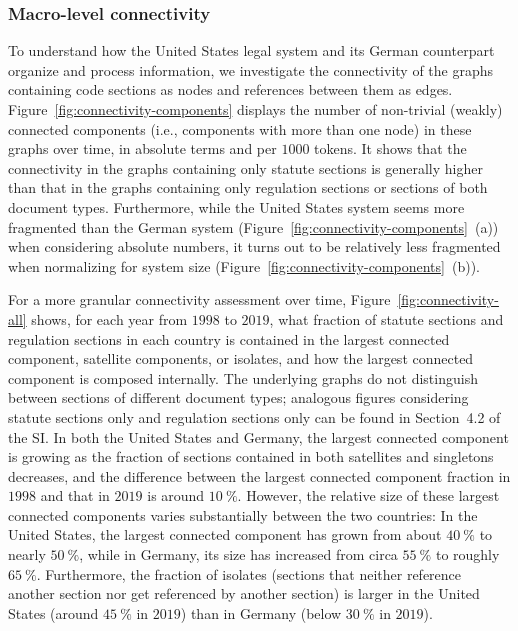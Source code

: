 \documentclass[utf8,sort&compress,table,hidelinks]{frontiersFPHY} %
\newcommand{\thesi}{SI\xspace}
\begin{document}
\vspace*{6pt}
\subsubsection{Macro-level connectivity}
\label{subsubsec:results:connectivity:macro}

To understand how the United States legal system and its German counterpart organize and process information, we investigate the connectivity of the graphs containing code sections as nodes and references between them as edges. 
Figure~\ref{fig:connectivity-components} displays the number of non-trivial (weakly) connected components (i.e., components with more than one node) in these graphs over time, 
in absolute terms and per $1000$ tokens.
It shows that the connectivity in the graphs containing only statute sections is generally higher than that in the graphs containing only regulation sections or sections of both document types.
Furthermore, while the United States system seems more fragmented than the German system (Figure~\ref{fig:connectivity-components}~(a)) when considering absolute numbers, it turns out to be relatively less fragmented when normalizing for system size (Figure~\ref{fig:connectivity-components}~(b)).



For a more granular connectivity assessment over time, Figure~\ref{fig:connectivity-all} shows, for each year from $1998$ to $2019$, what fraction of statute sections and regulation sections in each country is contained in the largest connected component, satellite components, or isolates, 
and how the largest connected component is composed internally. 
The underlying graphs do not distinguish between sections of different document types; 
analogous figures considering statute sections only and regulation sections only can be found in Section~4.2 of the \thesi.
In both the United States and Germany, the largest connected component is growing as the fraction of sections contained in both satellites and singletons decreases, 
and the difference between the largest connected component fraction in $1998$ and that in $2019$ is around $10~\%$. 
However, the relative size of these largest connected components varies substantially between the two countries: 
In the United States, the largest connected component has grown from about $40~\%$ to nearly $50~\%$, 
while in Germany, its size has increased from circa $55~\%$ to roughly $65~\%$.
Furthermore, the fraction of isolates (sections that neither reference another section nor get referenced by another section) is larger in the United States (around $45~\%$ in $2019$) than in Germany (below $30~\%$ in $2019$).
\end{document}
